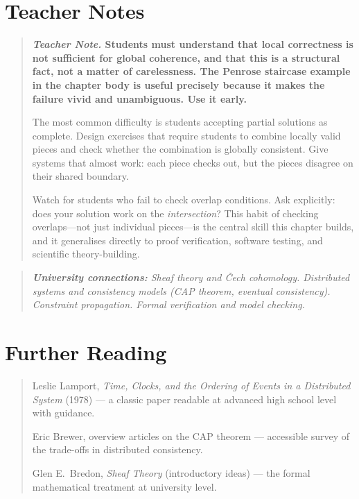 \documentclass[11pt]{book}
\theoremstyle{plain}
\theoremstyle{definition}
\theoremstyle{remark}
\newenvironment{teachernote}
  {\begin{quote}\small\bfseries\textit{Teacher Note.}\normalfont\small\enspace\ignorespaces}
  {\end{quote}}
\newenvironment{universitybridge}
  {\begin{quote}\small\itshape\textbf{University connections:}\normalfont\small\itshape\enspace\ignorespaces}
  {\end{quote}}
\newenvironment{readinglist}
  {\begin{quote}\small}
  {\end{quote}}
\begin{document}
\section*{Teacher Notes}

\begin{teachernote}
Students must understand that local correctness is not sufficient for
global coherence, and that this is a structural fact, not a matter of
carelessness. The Penrose staircase example in the chapter body is
useful precisely because it makes the failure vivid and unambiguous.
Use it early.

The most common difficulty is students accepting partial solutions as
complete. Design exercises that require students to combine locally
valid pieces and check whether the combination is globally consistent.
Give systems that almost work: each piece checks out, but the pieces
disagree on their shared boundary.

Watch for students who fail to check overlap conditions. Ask explicitly:
does your solution work on the \emph{intersection}? This habit of
checking overlaps---not just individual pieces---is the central skill
this chapter builds, and it generalises directly to proof verification,
software testing, and scientific theory-building.
\end{teachernote}

\begin{universitybridge}
Sheaf theory and \v{C}ech cohomology. Distributed systems and
consistency models (CAP theorem, eventual consistency). Constraint
propagation. Formal verification and model checking.
\end{universitybridge}

\section*{Further Reading}

\begin{readinglist}
Leslie Lamport, \textit{Time, Clocks, and the Ordering of Events in a
Distributed System} (1978) --- a classic paper readable at advanced
high school level with guidance.

Eric Brewer, overview articles on the CAP theorem --- accessible
survey of the trade-offs in distributed consistency.

Glen E.~Bredon, \textit{Sheaf Theory} (introductory ideas) --- the
formal mathematical treatment at university level.
\end{readinglist}
\end{document}
